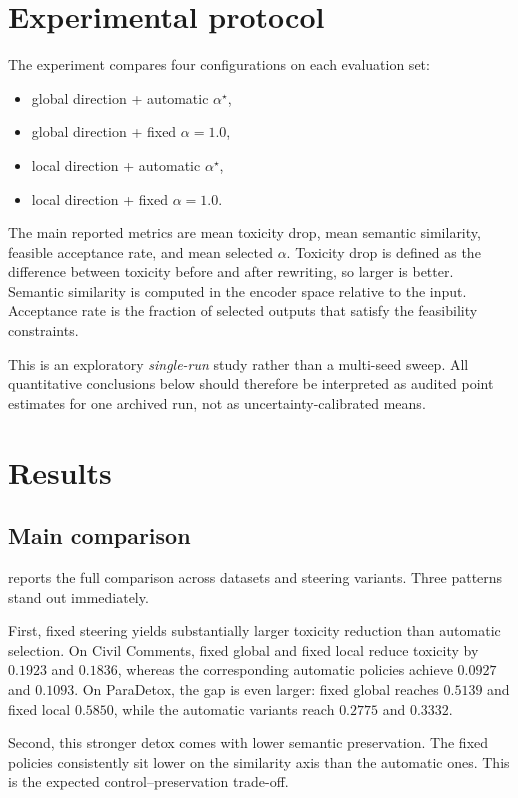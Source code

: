 \documentclass[10pt,twocolumn]{article}
\begin{document}
\section{Experimental protocol}
The experiment compares four configurations on each evaluation set:
\begin{itemize}[leftmargin=1.2em,itemsep=0.1em]
\item global direction + automatic $\alpha^\star$,
\item global direction + fixed $\alpha=1.0$,
\item local direction + automatic $\alpha^\star$,
\item local direction + fixed $\alpha=1.0$.
\end{itemize}

The main reported metrics are mean toxicity drop, mean semantic similarity, feasible acceptance rate, and mean selected $\alpha$. Toxicity drop is defined as the difference between toxicity before and after rewriting, so larger is better. Semantic similarity is computed in the encoder space relative to the input. Acceptance rate is the fraction of selected outputs that satisfy the feasibility constraints.

This is an exploratory \emph{single-run} study rather than a multi-seed sweep. All quantitative conclusions below should therefore be interpreted as audited point estimates for one archived run, not as uncertainty-calibrated means.

\section{Results}
\subsection{Main comparison}
 reports the full comparison across datasets and steering variants. Three patterns stand out immediately.

First, fixed steering yields substantially larger toxicity reduction than automatic selection. On Civil Comments, fixed global and fixed local reduce toxicity by $0.1923$ and $0.1836$, whereas the corresponding automatic policies achieve $0.0927$ and $0.1093$. On ParaDetox, the gap is even larger: fixed global reaches $0.5139$ and fixed local $0.5850$, while the automatic variants reach $0.2775$ and $0.3332$.

Second, this stronger detox comes with lower semantic preservation. The fixed policies consistently sit lower on the similarity axis than the automatic ones. This is the expected control--preservation trade-off.
\end{document}
